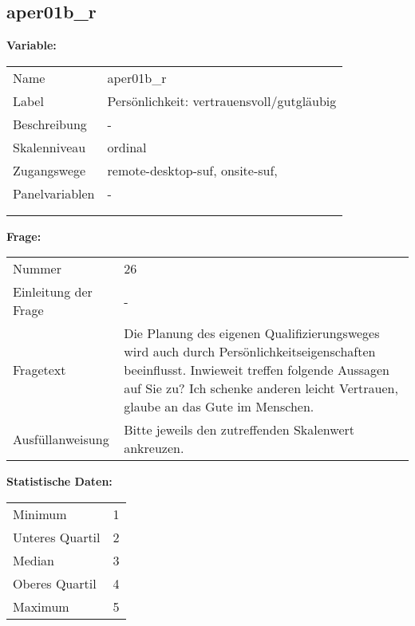 	
	
	\subsection{aper01b\_r}
	\label{subSection:aper01b_r}

	\noindent\textbf{Variable:}\\
		\begin{tabular}{lL{11.3cm}}
			\label{tableVariable:aper01b_r}
			Name & aper01b\_r \\
			Label & Persönlichkeit: vertrauensvoll/gutgläubig \\
			Beschreibung & - \\
			Skalenniveau & ordinal \\
			Zugangswege &
				remote-desktop-suf,
				onsite-suf,
 \\
			Panelvariablen & -
			 \\
			 \\
 \\
		\end{tabular}

		\vspace*{1 cm}
		\noindent\textbf{Frage:}\\
		\begin{tabular}{lL{11.3cm}}
			\label{tableQuestion:aper01b_r}
			Nummer & 26 \\
			Einleitung der Frage & - \\
			Fragetext & Die Planung des eigenen Qualifizierungsweges wird auch durch Persönlichkeitseigenschaften beeinflusst. Inwieweit treffen folgende Aussagen auf Sie zu?
Ich schenke anderen leicht Vertrauen, glaube an das Gute im Menschen. \\
			Ausfüllanweisung & Bitte jeweils den zutreffenden
Skalenwert ankreuzen. \\
		\end{tabular}


		\vspace*{1 cm}
		\noindent\textbf{Statistische Daten:}\\
			\begin{tabular}{ll}
				\label{tableStatistics:aper01b_r}
					Minimum & 1 \\
					Unteres Quartil & 2 \\
					Median & 3 \\
					Oberes Quartil & 4 \\
					Maximum & 5 \\
			\end{tabular}



